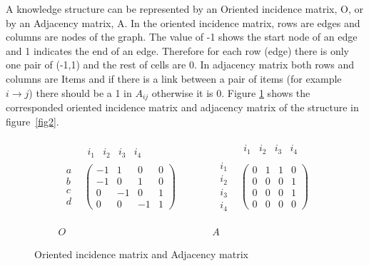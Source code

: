 A knowledge structure can be represented by an Oriented incidence matrix, O, or by an Adjacency matrix, A. In the oriented incidence matrix, rows are edges and columns are nodes of the graph. The value of -1 shows the start node of an edge and 1 indicates the end of an edge. Therefore for each row (edge) there is only one pair of (-1,1) and the rest of cells are 0. In adjacency matrix both rows and columns are Items and if there is a link between a pair of items (for example $i\rightarrow j$) there should be a 1 in $A_{ij}$ otherwise it is 0. Figure \ref{fig3IMAM} shows the corresponded oriented incidence matrix and adjacency matrix of the structure in figure~\ref{fig2}. 


\begin{figure}
\[
\begin{array}{ccccc}
\begin{array}{cc}
 & \begin{array}{cccc}
i_{1} & i_{2} & i_{3} & i_{4}\end{array}\\
\begin{array}{c}
a\\
b\\
c\\
d
\end{array} & \left(\begin{array}{cccc}
-1 & 1 & 0 & 0\\
-1 & 0 & 1 & 0\\
0 & -1 & 0 & 1\\
0 & 0 & -1 & 1
\end{array}\right)
\end{array} &  &  &  & \begin{array}{cc}
 & \begin{array}{cccc}
i_{1} & i_{2} & i_{3} & i_{4}\end{array}\\
\begin{array}{c}
i_{1}\\
i_{2}\\
i_{3}\\
i_{4}
\end{array} & \left(\begin{array}{cccc}
0 & 1 & 1 & 0\\
0 & 0 & 0 & 1\\
0 & 0 & 0 & 1\\
0 & 0 & 0 & 0
\end{array}\right)
\end{array}\\
\\
\\
O &  &  &  & A
\end{array}
\]


\caption{Oriented incidence matrix and Adjacency matrix}
\label{fig3IMAM}
\end{figure}


